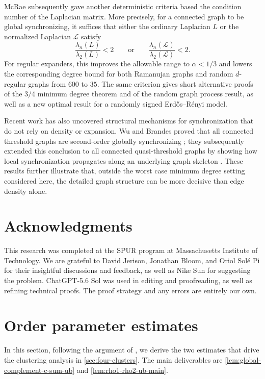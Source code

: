 \documentclass[reqno,11pt]{amsart}
\theoremstyle{definition}
\begin{document}
McRae \cite{mcrae-benign-landscapes} subsequently gave another deterministic criteria based the condition number of the Laplacian matrix. More precisely, for a connected graph to be  global synchronizing, it suffices that either the ordinary Laplacian $L$ or the normalized Laplacian $\mathcal{L}$ satisfy
\[
    \frac{\lambda_n(L)}{\lambda_2(L)}<2
    \qquad\text{or}\qquad
    \frac{\lambda_n(\mathcal{L})}{\lambda_2(\mathcal{L})}<2.
\]
For regular expanders, this improves the
allowable range to $\alpha<1/3$ and lowers the corresponding degree bound for both Ramanujan graphs and random $d$-regular graphs from $600$ to $35$. The same criterion gives short alternative proofs of the $3/4$ minimum degree theorem and of the random graph process result, as well as a new optimal result for a randomly signed Erd\H{o}s--R\'enyi model. 

Recent work has also uncovered structural mechanisms for synchronization
that do not rely on density or expansion. Wu and Brandes proved that all
connected threshold graphs are second-order globally synchronizing
\cite{wu-brandes-threshold}; they subsequently extended this conclusion
to all connected quasi-threshold graphs by showing how local
synchronization propagates along an underlying graph skeleton
\cite{wu-brandes-skeleton}. These results further illustrate that, outside
the worst case minimum degree setting considered here, the detailed graph structure can be more decisive than edge density alone.

\section*{Acknowledgments}

This research was completed at the SPUR program at Massachusetts Institute of Technology. We are grateful to David Jerison, Jonathan Bloom, and Oriol Sol\'e Pi for their insightful discussions and feedback, as well as Nike Sun for suggesting the problem. ChatGPT-5.6 Sol was used in editing and proofreading, as well as refining technical proofs. The proof strategy and any errors are entirely our own.


\section{Order parameter estimates}\label{sec:order-parameters}
In this section, following the argument of
\cite{kassabov-strogatz-townsend-dense}, we derive the two estimates that
drive the clustering analysis in \cref{sec:four-clusters}.  The main deliverables are 
\cref{lem:global-complement-c-sum-ub} and \cref{lem:rho1-rho2-ub-main}.
\end{document}
